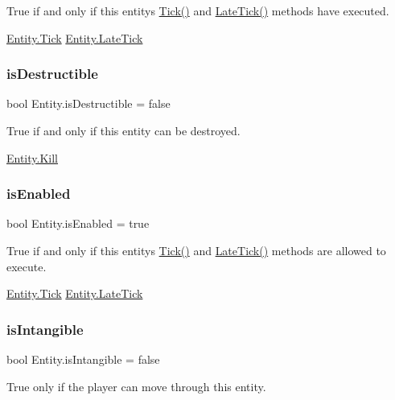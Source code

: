 True if and only if this entity\textquotesingle{}s \mbox{\hyperlink{class_entity_a7a09da64c6d87cd1bce0bb69512d82fc}{Tick()}} and \mbox{\hyperlink{class_entity_a80e2936e1d8d8590dc183b2980fcd3c9}{Late\+Tick()}} methods have executed. 

\mbox{\hyperlink{class_entity_a7a09da64c6d87cd1bce0bb69512d82fc}{Entity.\+Tick}} \mbox{\hyperlink{class_entity_a80e2936e1d8d8590dc183b2980fcd3c9}{Entity.\+Late\+Tick}} \mbox{\label{class_entity_ae1d1e0c619e8f41d50d948b5f2c2cefd}} 
\subsubsection{\texorpdfstring{is\+Destructible}{isDestructible}}
{\footnotesize\ttfamily bool Entity.\+is\+Destructible = false}



True if and only if this entity can be destroyed. 

\mbox{\hyperlink{class_entity_af02fade3c492c47394ebd4981de96b1d}{Entity.\+Kill}} \mbox{\label{class_entity_aafcac2c050f5043481675c18490efe51}} 
\subsubsection{\texorpdfstring{is\+Enabled}{isEnabled}}
{\footnotesize\ttfamily bool Entity.\+is\+Enabled = true}



True if and only if this entity\textquotesingle{}s \mbox{\hyperlink{class_entity_a7a09da64c6d87cd1bce0bb69512d82fc}{Tick()}} and \mbox{\hyperlink{class_entity_a80e2936e1d8d8590dc183b2980fcd3c9}{Late\+Tick()}} methods are allowed to execute. 

\mbox{\hyperlink{class_entity_a7a09da64c6d87cd1bce0bb69512d82fc}{Entity.\+Tick}} \mbox{\hyperlink{class_entity_a80e2936e1d8d8590dc183b2980fcd3c9}{Entity.\+Late\+Tick}} \mbox{\label{class_entity_a392e02c7155fc0b9a0fd344b7c01c025}} 
\subsubsection{\texorpdfstring{is\+Intangible}{isIntangible}}
{\footnotesize\ttfamily bool Entity.\+is\+Intangible = false}



True only if the player can move through this entity. 

